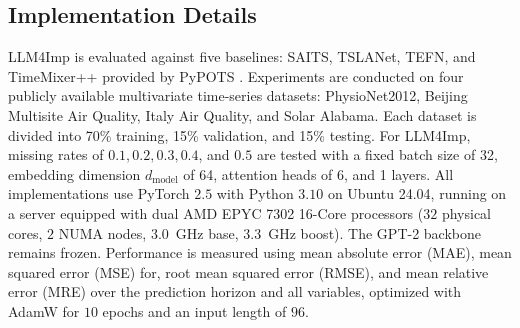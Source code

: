 \documentclass[conference]{IEEEtran}
\begin{document}
\subsection{Implementation Details}
\label{subsec:implementation}
LLM4Imp is evaluated against five baselines: SAITS, TSLANet, TEFN, and TimeMixer++ provided by PyPOTS \cite{PyPOTS}. Experiments are conducted on four publicly available multivariate time-series datasets: PhysioNet2012, Beijing Multisite Air Quality, Italy Air Quality, and Solar Alabama. Each dataset is divided into 70\% training, 15\% validation, and 15\% testing. For LLM4Imp, missing rates of $0.1, 0.2, 0.3, 0.4$, and $0.5$ are tested with a fixed batch size of 32, embedding dimension $d_{\mathrm{model}}$ of 64, attention heads of 6, and 1 layers. All implementations use PyTorch $2.5$ with Python $3.10$ on Ubuntu 24.04, running on a server equipped with dual AMD EPYC 7302 16-Core processors ($32$ physical cores, $2$ NUMA nodes, $3.0$~GHz base, $3.3$~GHz boost). The GPT-2 backbone remains frozen. Performance is measured using mean absolute error (MAE), mean squared error (MSE) for, root mean squared error (RMSE), and mean relative error (MRE) over the prediction horizon and all variables, optimized with AdamW for $10$ epochs and an input length of $96$.
\end{document}
